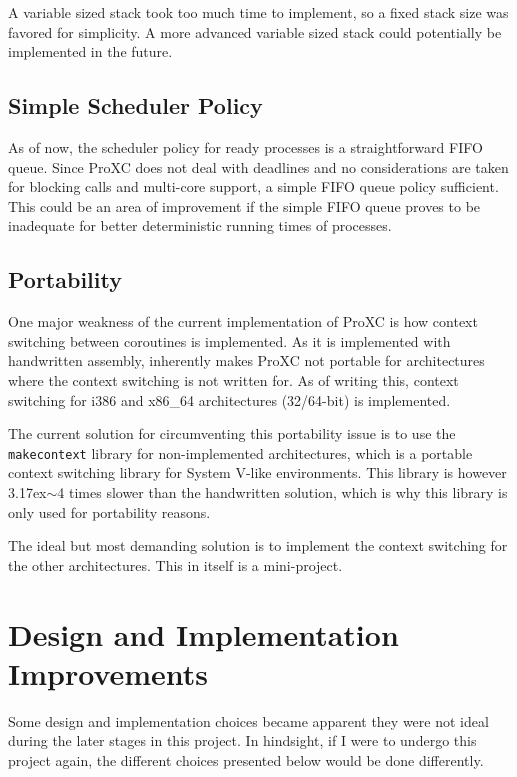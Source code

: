 A variable sized stack took too much time to implement, so a fixed stack size was favored for simplicity. A more advanced variable sized stack could potentially be implemented in the future. 

\subsection{Simple Scheduler Policy}

As of now, the scheduler policy for ready processes is a straightforward FIFO queue. Since ProXC does not deal with deadlines and no considerations are taken for blocking calls and multi\hyp{}core support, a simple FIFO queue policy sufficient. This could be an area of improvement if the simple FIFO queue proves to be inadequate for better deterministic running times of processes. 

\subsection{Portability}
\label{sec:portability}

One major weakness of the current implementation of ProXC is how context switching between coroutines is implemented. As it is implemented with handwritten assembly, inherently makes ProXC not portable for architectures where the context switching is not written for. As of writing this, context switching for i386 and x86\_64 architectures (32/64\hyp{}bit) is implemented.

The current solution for circumventing this portability issue is to use the \texttt{makecontext} \citep{manmakecontext} library for non\hyp{}implemented architectures, which is a portable context switching library for System V\hyp{}like environments. This library is however 3{\raise.17ex\hbox{$\scriptstyle\mathtt{\sim}$}}4 times slower than the handwritten solution, which is why this library is only used for portability reasons. 

The ideal but most demanding solution is to implement the context switching for the other architectures. This in itself is a mini\hyp{}project.

\section{Design and Implementation Improvements}

Some design and implementation choices became apparent they were not ideal during the later stages in this project. In hindsight, if I were to undergo this project again, the different choices presented below would be done differently.

